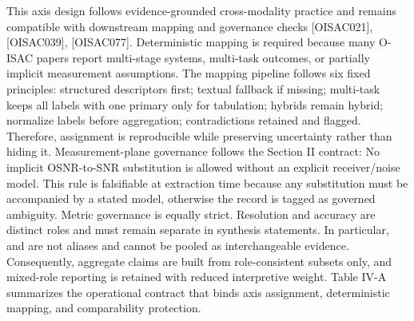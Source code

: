 {}This axis design follows evidence-grounded cross-modality practice and remains compatible with downstream mapping and governance checks [O\markdownRendererUnderscore{}ISAC\markdownRendererUnderscore{}021], [O\markdownRendererUnderscore{}ISAC\markdownRendererUnderscore{}039], [O\markdownRendererUnderscore{}ISAC\markdownRendererUnderscore{}077].\markdownRendererInterblockSeparator
{}
\markdownRendererSectionEnd \markdownRendererSectionBegin
{}\markdownRendererInterblockSeparator
{}Deterministic mapping is required because many O-ISAC papers report multi-stage systems, multi-task outcomes, or partially implicit measurement assumptions. The mapping pipeline follows six fixed principles: structured descriptors first; textual fallback if missing; multi-task keeps all labels with one primary only for tabulation; hybrids remain hybrid; normalize labels before aggregation; contradictions retained and flagged. Therefore, assignment is reproducible while preserving uncertainty rather than hiding it.\markdownRendererParagraphSeparator
{}Measurement-plane governance follows the Section II contract:\markdownRendererSoftLineBreak
{}\markdownRendererSoftLineBreak
{}No implicit OSNR-to-SNR substitution is allowed without an explicit receiver/noise model. This rule is falsifiable at extraction time because any substitution must be accompanied by a stated model, otherwise the record is tagged as governed ambiguity.\markdownRendererParagraphSeparator
{}Metric governance is equally strict. Resolution and accuracy are distinct roles and must remain separate in synthesis statements. In particular,  and  are not aliases and cannot be pooled as interchangeable evidence. Consequently, aggregate claims are built from role-consistent subsets only, and mixed-role reporting is retained with reduced interpretive weight.\markdownRendererParagraphSeparator
{}Table IV-A summarizes the operational contract that binds axis assignment, deterministic mapping, and comparability protection.\markdownRendererInterblockSeparator
